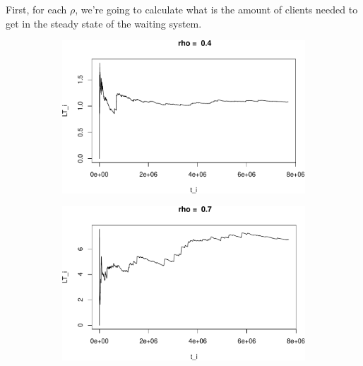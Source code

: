 \documentclass[]{article}
\begin{document}
First, for each \(\rho\), we're going to calculate what is the amount of
clients needed to get in the steady state of the waiting system.



\begin{figure}[h!]
\begin{subfigure}[b]{.55\linewidth}

\includegraphics[width=\linewidth]{003_files/figure-latex/unnamed-chunk-10-1.pdf}
\end{subfigure}\hfill
\begin{subfigure}[b]{.55\linewidth}
\includegraphics[width=\linewidth]{003_files/figure-latex/unnamed-chunk-10-2.pdf}
\end{subfigure}\vfill
\end{figure}
\end{document}
